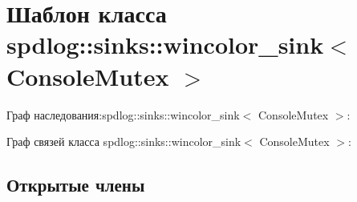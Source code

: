 \hypertarget{classspdlog_1_1sinks_1_1wincolor__sink}{}\section{Шаблон класса spdlog\+:\+:sinks\+:\+:wincolor\+\_\+sink$<$ Console\+Mutex $>$}
\label{classspdlog_1_1sinks_1_1wincolor__sink}


Граф наследования\+:spdlog\+:\+:sinks\+:\+:wincolor\+\_\+sink$<$ Console\+Mutex $>$\+:


Граф связей класса spdlog\+:\+:sinks\+:\+:wincolor\+\_\+sink$<$ Console\+Mutex $>$\+:
\subsection*{Открытые члены}
